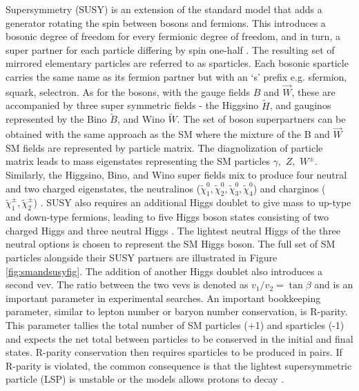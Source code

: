 Supersymmetry (SUSY) is an extension of the standard model that adds a generator rotating the spin between bosons and fermions. This introduces a bosonic degree of freedom for every fermionic degree of freedom, and in turn, a super partner for each particle differing by spin one-half \cite{Baer:2007izw}.  The resulting set of mirrored elementary particles are referred to as sparticles. Each bosonic sparticle carries the same name as its fermion partner but with an `s' prefix e.g. sfermion, squark, selectron. As for the bosons, with the gauge fields $B$ and $\vec{W}$, these are accompanied by three super symmetric fields - the Higgsino $\tilde{H}$, and gauginos represented by the Bino $\tilde{B}$, and Wino $\tilde{W}$. The set of boson superpartners can be obtained with the same approach as the SM where the mixture of the B and $\vec{W}$ SM fields are represented by particle matrix.  The diagnolization of particle matrix leads to mass eigenstates representing the SM particles $\gamma, \, \, Z, \, \, W^\pm$. Similarly, the Higgsino, Bino, and Wino super fields mix to produce four neutral and two charged eigenstates, the neutralinos ($\tilde{\chi}^0_1, \tilde{\chi}^0_2, \tilde{\chi}^0_3, \tilde{\chi}^0_4$)  and charginos ($\tilde{\chi}^\pm_1, \tilde{\chi}^\pm_2$) \cite{DJOUADI_2008}. SUSY also requires an additional Higgs doublet to give mass to up-type and down-type fermions,  leading to five Higgs boson states consisting of two charged Higgs and three neutral Higgs \cite{Adam:2021rrw}. The lightest neutral Higgs of the three neutral options is chosen to represent the SM Higgs boson. The full set of SM particles alongside their SUSY partners are illustrated in Figure \ref{fig:smandsusyfig}. The addition of another Higgs doublet also introduces a second vev. The ratio between the two vevs is denoted as $v_1/v_2 = \tan \beta$ and is an important parameter in experimental searches. An important bookkeeping parameter, similar to lepton number or baryon number conservation, is R-parity. This parameter tallies the total number of SM particles (+1) and sparticles (-1) and expects the net total between particles to be conserved in the initial and final states. R-parity conservation then requires sparticles to be produced in pairs. If R-parity is violated, the common consequence is that the lightest supersymmetric particle (LSP) is unstable or the models allows protons to decay \cite{Farrar:1978xj}. 




